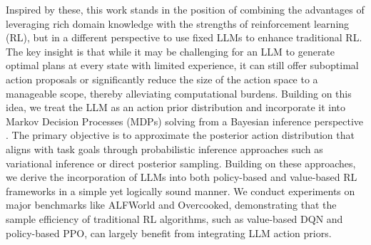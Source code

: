 \documentclass{article} %
\theoremstyle{plain}
\theoremstyle{definition}
\theoremstyle{remark}
\newcommand{\yan}[1]{{ \color{blue}[yan: #1]}}
\begin{document}
Inspired by these, this work stands in the position of combining the advantages of leveraging rich domain knowledge with the strengths of reinforcement learning (RL), but in a different perspective to use fixed LLMs to enhance traditional RL.
The key insight is that while it may be challenging for an LLM to generate optimal plans at every state with limited experience, it can still offer suboptimal action proposals or significantly reduce the size of the action space to a manageable scope, thereby alleviating computational burdens. Building on this idea, we treat the LLM as an action prior distribution and incorporate it into Markov Decision Processes (MDPs) solving from a Bayesian inference perspective \citep{hu2023amortizing}. The primary objective is to approximate the posterior action distribution that aligns with task goals through probabilistic inference approaches such as variational inference or direct posterior sampling. Building on these approaches, we derive the incorporation of LLMs into both policy-based and value-based RL frameworks in a simple yet logically sound manner. We conduct experiments on major benchmarks like ALFWorld and Overcooked, demonstrating that the sample efficiency of traditional RL algorithms, such as value-based DQN and policy-based PPO, can largely benefit from integrating LLM action priors.%

\end{document}

